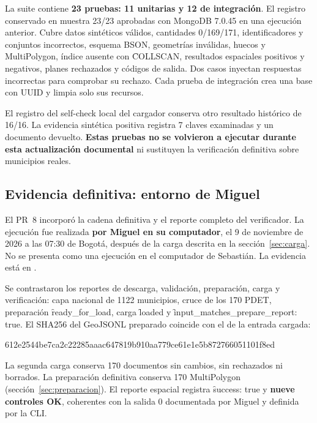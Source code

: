 La suite contiene \textbf{23 pruebas: 11 unitarias y 12 de integración}. El registro conservado en  muestra 23/23 aprobadas con MongoDB 7.0.45 en una ejecución anterior. Cubre datos sintéticos válidos, cantidades 0/169/171, identificadores y conjuntos incorrectos, esquema BSON, geometrías inválidas, huecos y MultiPolygon, índice ausente con \f{COLLSCAN}, resultados espaciales positivos y negativos, planes rechazados y códigos de salida. Dos casos inyectan respuestas incorrectas para comprobar su rechazo. Cada prueba de integración crea una base con UUID y limpia solo sus recursos.

El registro del self-check local del cargador conserva otro resultado histórico de 16/16. La evidencia sintética positiva registra 7 claves examinadas y un documento devuelto. \textbf{Estas pruebas no se volvieron a ejecutar durante esta actualización documental} ni sustituyen la verificación definitiva sobre municipios reales.

\subsection{Evidencia definitiva: entorno de Miguel}

El PR~8 incorporó la cadena definitiva y el reporte completo del verificador. La ejecución fue realizada \textbf{por Miguel en su computador}, el 9 de noviembre de 2026 a las 07:30 de Bogotá, después de la carga descrita en la sección~\ref{sec:carga}. No se presenta como una ejecución en el computador de Sebastián. La evidencia está en .

Se contrastaron los reportes de descarga, validación, preparación, carga y verificación: capa nacional de 1122 municipios, cruce de los 170 PDET, preparación \f{ready\_for\_load}, carga \f{loaded} y \f{input\_matches\_prepare\_report: true}. El SHA256 del GeoJSONL preparado coincide con el de la entrada cargada:
\begin{center}\scriptsize\ttfamily
612e2544be7ca2c22285aaac647819b910aa779ce61e1e5b872766051101f8ed
\end{center}
La segunda carga conserva 170 documentos sin cambios, sin rechazados ni borrados. La preparación definitiva conserva 170 MultiPolygon (sección~\ref{sec:preparacion}). El reporte espacial registra \f{success: true} y \textbf{nueve controles OK}, coherentes con la salida 0 documentada por Miguel y definida por la CLI.

